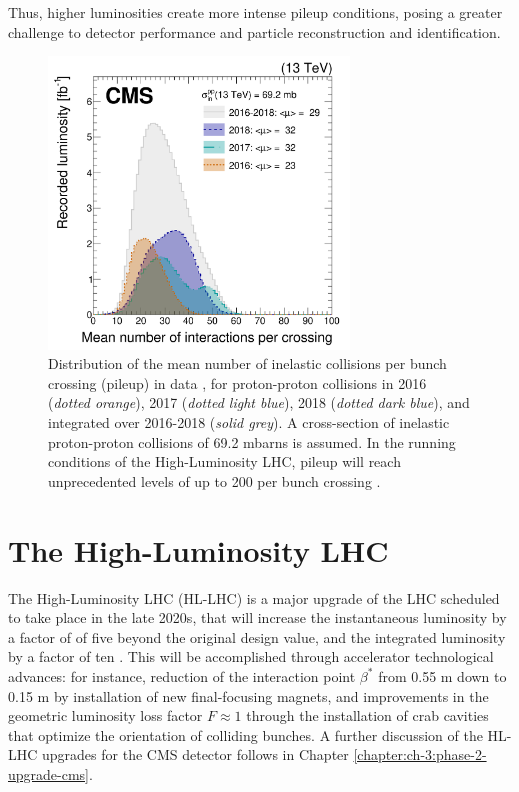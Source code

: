 Thus, higher luminosities create more intense pileup conditions, posing a greater challenge to detector performance and particle reconstruction and identification.

\begin{figure}[ht]
    \centering
    \includegraphics[width=8cm]{figures/ch-2-cern-cms/pileup-run-2-CMS-JME-18-001_Figure_001.png}
    \caption[Distribution of the mean number of inelastic collisions per bunch crossing (pileup) in data, for proton-proton collisions in 2016-2018]{Distribution of the mean number of inelastic collisions per bunch crossing (pileup) in data \cite{CMS-JME-18-001}, for proton-proton collisions in 2016 (\textit{dotted orange}), 2017 (\textit{dotted light blue}), 2018 (\textit{dotted dark blue}), and integrated over 2016-2018 (\textit{solid grey}). A cross-section of inelastic proton-proton collisions of 69.2 mbarns is assumed. In the running conditions of the High-Luminosity LHC, pileup will reach unprecedented levels of up to 200 per bunch crossing \cite{CERN-2020-010-HL-LHC-TDR}.}
    \label{fig:pileup-run-2}
\end{figure}

\section{The High-Luminosity LHC}
\label{sec:HL-LHC}
The High-Luminosity LHC (HL-LHC) is a major upgrade of the LHC scheduled to take place in the late 2020s, that will increase the instantaneous luminosity by a factor of of five beyond the original design value, and the integrated luminosity by a factor of ten \cite{CERN-2020-010-HL-LHC-TDR}. This will be accomplished through accelerator technological advances: for instance, reduction of the interaction point $\beta^*$ from 0.55 m down to 0.15 m by installation of new final-focusing magnets, and improvements in the geometric luminosity loss factor $F \approx 1$ through the installation of crab cavities that optimize the orientation of colliding bunches. A further discussion of the HL-LHC upgrades for the CMS detector follows in Chapter \ref{chapter:ch-3:phase-2-upgrade-cms}.

